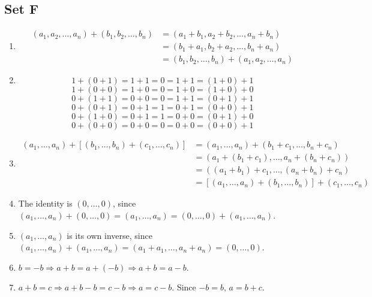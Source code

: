 \documentclass{article}
\begin{document}
\subsection{Set F}
\begin{enumerate}
    \item \begin{equation*}
            \begin{split}
                (a_1, a_2, \ldots, a_n) + (b_1, b_2, \ldots, b_n) & = (a_1 + b_1, a_2 + b_2, \ldots, a_n + b_n) \\
                                                                   & = (b_1 + a_1, b_2 + a_2, \ldots, b_n + a_n) \\
                                                                  & = (b_1, b_2, \ldots, b_n) + (a_1, a_2, \ldots, a_n)
            \end{split}
        \end{equation*}
    \item 
        $$1 + (0 + 1) = 1 + 1 = 0 = 1 + 1 = (1 + 0) + 1$$
        $$1 + (0 + 0) = 1 + 0 = 0 = 1 + 0 = (1 + 0) + 0$$
        $$0 + (1 + 1) = 0 + 0 = 0 = 1 + 1 = (0 + 1) + 1$$
        $$0 + (0 + 1) = 0 + 1 = 1 = 0 + 1 = (0 + 0) + 1$$
        $$0 + (1 + 0) = 0 + 1 = 1 = 0 + 0 = (0 + 1) + 0$$
        $$0 + (0 + 0) = 0 + 0 = 0 = 0 + 0 = (0 + 0) + 1$$
    \item
        \begin{equation*}
            \begin{split}
                (a_1, \ldots, a_n) + [(b_1, \ldots, b_n) + (c_1, \ldots, c_n)] & = (a_1, \ldots, a_n) + (b_1 + c_1, \ldots, b_n + c_n) \\
                                                                               & = (a_1 + (b_1 + c_1), \ldots, a_n + (b_n + c_n)) \\
                                                                               & = ((a_1 + b_1) + c_1, \ldots, (a_n + b_n) + c_n) \\
                                                                               & = [(a_1, \ldots, a_n) + (b_1, \ldots, b_n)] + (c_1, \ldots, c_n)
            \end{split}
        \end{equation*}
    \item The identity is $(0, \ldots, 0)$, since $(a_1, \ldots, a_n) + (0, \ldots, 0) = (a_1, \ldots, a_n) = (0, \ldots, 0) + (a_1, \ldots, a_n)$.
    \item $(a_1, \ldots, a_n)$ is its own inverse, since $(a_1, \ldots, a_n) + (a_1, \ldots, a_n) = (a_1 + a_1, \ldots, a_n + a_n) = (0, \ldots, 0)$.
    \item $b = -b \Rightarrow a + b = a + (-b) \Rightarrow a + b = a - b$.
    \item $a + b = c \Rightarrow a + b - b = c - b \Rightarrow a = c - b$. Since $-b = b$, $a = b + c$.
\end{enumerate}
\end{document}
